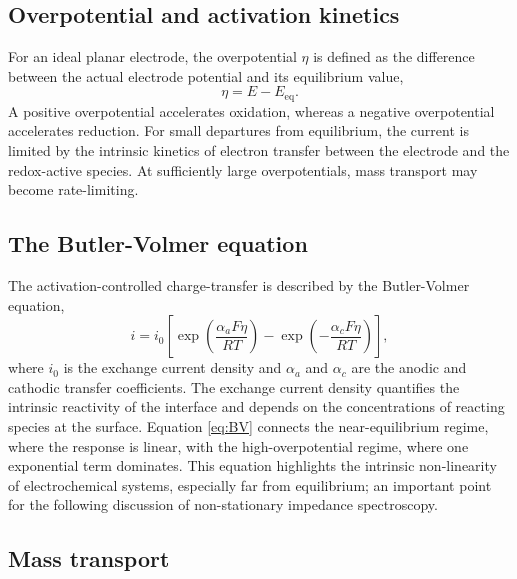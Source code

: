 \subsection{Overpotential and activation kinetics}

For an ideal planar electrode, the overpotential $\eta$ is defined as the difference between the actual electrode potential and its equilibrium value,
\begin{equation}
    \eta = E - E_{\mathrm{eq}}.
\end{equation}
A positive overpotential accelerates oxidation, whereas a negative overpotential accelerates reduction. 
For small departures from equilibrium, the current is limited by the intrinsic kinetics of electron transfer between the electrode and the redox-active species. 
At sufficiently large overpotentials, mass transport may become rate-limiting.

\subsection{The Butler-Volmer equation}

The activation-controlled charge-transfer is described by the Butler-Volmer equation,
\begin{equation}
    i = i_0 \left[ \exp\!\left( \frac{\alpha_a F \eta}{RT} \right) - \exp\!\left( -\frac{\alpha_c F \eta}{RT} \right) \right],
    \label{eq:BV}
\end{equation}
where $i_0$ is the exchange current density and $\alpha_a$ and $\alpha_c$ are the anodic and cathodic transfer coefficients. 
The exchange current density quantifies the intrinsic reactivity of the interface and depends on the concentrations of reacting species at the surface. 
Equation \ref{eq:BV} connects the near-equilibrium regime, where the response is linear, with the high-overpotential regime, where one exponential term dominates.
This equation highlights the intrinsic non-linearity of electrochemical systems, especially far from equilibrium; an important point for the following discussion of non-stationary impedance spectroscopy.

\subsection{Mass transport}

